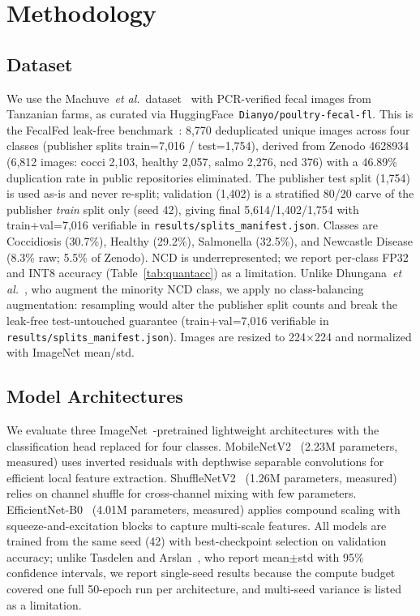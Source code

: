 \documentclass[conference,a4paper]{IEEEtran}
\begin{document}
\section{Methodology}

\subsection{Dataset}
We use the Machuve~\textit{et al.}~dataset~\cite{machuve22} with PCR-verified fecal images from Tanzanian farms, as curated via HuggingFace~\texttt{Dianyo/poultry-fecal-fl}. This is the FecalFed leak-free benchmark~\cite{chi2026}: 8,770 deduplicated unique images across four classes (publisher splits train=7,016 / test=1,754), derived from Zenodo 4628934 (6,812 images: cocci 2,103, healthy 2,057, salmo 2,276, ncd 376) with a 46.89\% duplication rate in public repositories eliminated. The publisher test split (1,754) is used as-is and never re-split; validation (1,402) is a stratified 80/20 carve of the publisher \textit{train} split only (seed 42), giving final 5,614/1,402/1,754 with train+val=7,016 verifiable in \texttt{results/splits\_manifest.json}. Classes are Coccidiosis (30.7\%), Healthy (29.2\%), Salmonella (32.5\%), and Newcastle Disease (8.3\% raw; 5.5\% of Zenodo). NCD is underrepresented; we report per-class FP32 and INT8 accuracy (Table~\ref{tab:quantacc}) as a limitation. Unlike Dhungana~\textit{et al.}~\cite{dhungana2025}, who augment the minority NCD class, we apply no class-balancing augmentation: resampling would alter the publisher split counts and break the leak-free test-untouched guarantee (train+val=7,016 verifiable in \texttt{results/splits\_manifest.json}). Images are resized to 224$\times$224 and normalized with ImageNet mean/std.

\subsection{Model Architectures}
We evaluate three ImageNet~\cite{deng2009}-pretrained lightweight architectures with the classification head replaced for four classes. MobileNetV2~\cite{mobilenetv2} (2.23M parameters, measured) uses inverted residuals with depthwise separable convolutions for efficient local feature extraction. ShuffleNetV2~\cite{shufflenetv2} (1.26M parameters, measured) relies on channel shuffle for cross-channel mixing with few parameters. EfficientNet-B0~\cite{efficientnet} (4.01M parameters, measured) applies compound scaling with squeeze-and-excitation blocks to capture multi-scale features. All models are trained from the same seed (42) with best-checkpoint selection on validation accuracy; unlike Tasdelen and Arslan~\cite{tasdelen2025}, who report mean$\pm$std with 95\% confidence intervals, we report single-seed results because the compute budget covered one full 50-epoch run per architecture, and multi-seed variance is listed as a limitation.
\end{document}
